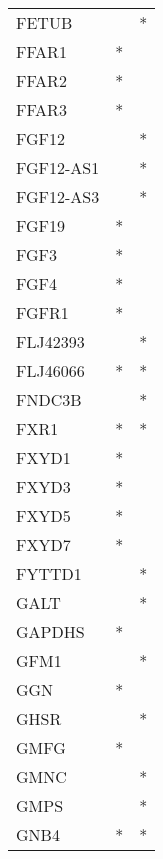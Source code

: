 \begin{longtable}{lcc}
FETUB            &                &          * \\
FFAR1            &              * &            \\
FFAR2            &              * &            \\
FFAR3            &              * &            \\
FGF12            &                &          * \\
FGF12-AS1        &                &          * \\
FGF12-AS3        &                &          * \\
FGF19            &              * &            \\
FGF3             &              * &            \\
FGF4             &              * &            \\
FGFR1            &              * &            \\
FLJ42393         &                &          * \\
FLJ46066         &              * &          * \\
FNDC3B           &                &          * \\
FXR1             &              * &          * \\
FXYD1            &              * &            \\
FXYD3            &              * &            \\
FXYD5            &              * &            \\
FXYD7            &              * &            \\
FYTTD1           &                &          * \\
GALT             &                &          * \\
GAPDHS           &              * &            \\
GFM1             &                &          * \\
GGN              &              * &            \\
GHSR             &                &          * \\
GMFG             &              * &            \\
GMNC             &                &          * \\
GMPS             &                &          * \\
GNB4             &              * &          * \\

\end{longtable}
